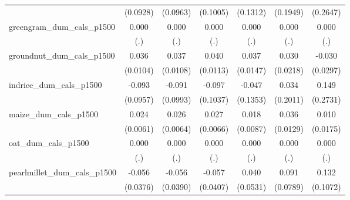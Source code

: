 {\begin{tabular}{l*{6}{c}}
                    &    (0.0928)         &    (0.0963)         &    (0.1005)         &    (0.1312)         &    (0.1949)         &    (0.2647)         \\
\addlinespace
greengram\_dum\_cals\_p1500&       0.000         &       0.000         &       0.000         &       0.000         &       0.000         &       0.000         \\
                    &         (.)         &         (.)         &         (.)         &         (.)         &         (.)         &         (.)         \\
\addlinespace
groundnut\_dum\_cals\_p1500&       0.036\sym{***}&       0.037\sym{***}&       0.040\sym{***}&       0.037\sym{*}  &       0.030         &      -0.030         \\
                    &    (0.0104)         &    (0.0108)         &    (0.0113)         &    (0.0147)         &    (0.0218)         &    (0.0297)         \\
\addlinespace
indrice\_dum\_cals\_p1500&      -0.093         &      -0.091         &      -0.097         &      -0.047         &       0.034         &       0.149         \\
                    &    (0.0957)         &    (0.0993)         &    (0.1037)         &    (0.1353)         &    (0.2011)         &    (0.2731)         \\
\addlinespace
maize\_dum\_cals\_p1500&       0.024\sym{***}&       0.026\sym{***}&       0.027\sym{***}&       0.018\sym{*}  &       0.036\sym{**} &       0.010         \\
                    &    (0.0061)         &    (0.0064)         &    (0.0066)         &    (0.0087)         &    (0.0129)         &    (0.0175)         \\
\addlinespace
oat\_dum\_cals\_p1500  &       0.000         &       0.000         &       0.000         &       0.000         &       0.000         &       0.000         \\
                    &         (.)         &         (.)         &         (.)         &         (.)         &         (.)         &         (.)         \\
\addlinespace
pearlmillet\_dum\_cals\_p1500&      -0.056         &      -0.056         &      -0.057         &       0.040         &       0.091         &       0.132         \\
                    &    (0.0376)         &    (0.0390)         &    (0.0407)         &    (0.0531)         &    (0.0789)         &    (0.1072)         \\

\end{tabular}}
